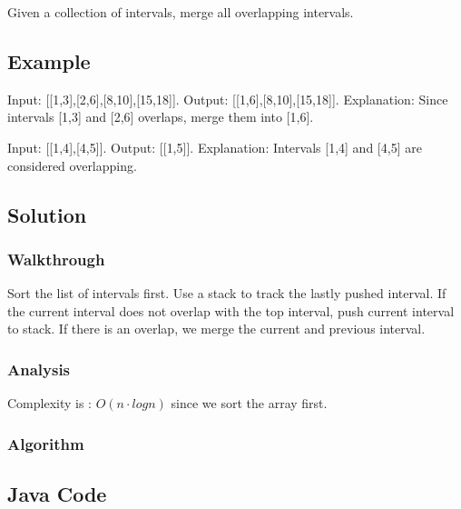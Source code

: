 \documentclass[]{book}
\begin{document}
Given a collection of intervals, merge all overlapping intervals.

\hypertarget{example-18}{%
\subsection{Example}\label{example-18}}

Input: {[}{[}1,3{]},{[}2,6{]},{[}8,10{]},{[}15,18{]}{]}. Output: {[}{[}1,6{]},{[}8,10{]},{[}15,18{]}{]}. Explanation: Since intervals {[}1,3{]} and {[}2,6{]} overlaps, merge them into {[}1,6{]}.

Input: {[}{[}1,4{]},{[}4,5{]}{]}. Output: {[}{[}1,5{]}{]}. Explanation: Intervals {[}1,4{]} and {[}4,5{]} are considered overlapping.

\hypertarget{solution-14}{%
\subsection{Solution}\label{solution-14}}

\hypertarget{walkthrough-18}{%
\subsubsection{Walkthrough}\label{walkthrough-18}}

Sort the list of intervals first. Use a stack to track the lastly pushed interval. If the current interval does
not overlap with the top interval, push current interval to stack. If there is an overlap, we merge the
current and previous interval.

\hypertarget{analysis-20}{%
\subsubsection{Analysis}\label{analysis-20}}

Complexity is : \(O(n \cdot log n)\) since we sort the array first.

\hypertarget{algorithm-20}{%
\subsubsection{Algorithm}\label{algorithm-20}}

\hypertarget{java-code-16}{%
\subsection{Java Code}\label{java-code-16}}
\end{document}
